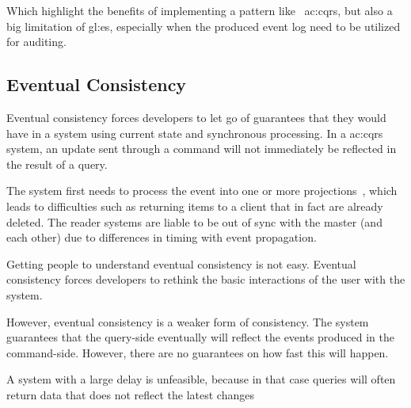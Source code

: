 Which highlight the benefits of implementing a pattern like ~\gls{ac:cqrs}, but also a big limitation of \gls{gl:es}, especially when the produced event log need to be utilized for auditing.

\subsection{Eventual Consistency}

Eventual consistency forces developers to let go of guarantees that they would have in a system using current state and synchronous processing. In a \gls{ac:cqrs} system, an update sent through a command will not immediately be reflected in the result of a query. 

The system first needs to process the event into one or more projections~\citep{OVEREEM2021110970}, which leads to difficulties such as returning items to a client that in fact are already deleted. The reader systems are liable to be out of sync with the master (and each other) due to differences in timing with event propagation.

Getting people to understand eventual consistency is not easy. Eventual consistency forces developers to rethink the basic interactions of the user with the system. 

However, eventual consistency is a weaker form of consistency. The system guarantees that the query-side eventually will reflect the events produced in the command-side. However, there are no guarantees on how fast this will happen. 

A system with a large delay is unfeasible, because in that case queries will often return data that does not reflect the latest changes


